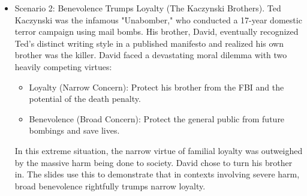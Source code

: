 \documentclass[12pt]{article}
\begin{document}
\begin{enumerate}
\begin{itemize}
        \item Scenario 2: Benevolence Trumps Loyalty (The Kaczynski Brothers). Ted Kaczynski was the infamous "Unabomber," who conducted a 17-year domestic terror campaign using mail bombs. His brother, David, eventually recognized Ted's distinct writing style in a published manifesto and realized his own brother was the killer.\newline
        David faced a devastating moral dilemma with two heavily competing virtues:
        \begin{itemize}
            \item Loyalty (Narrow Concern): Protect his brother from the FBI and the potential of the death penalty.
            \item Benevolence (Broad Concern): Protect the general public from future bombings and save lives.
        \end{itemize}
        In this extreme situation, the narrow virtue of familial loyalty was outweighed by the massive harm being done to society. David chose to turn his brother in. The slides use this to demonstrate that in contexts involving severe harm, broad benevolence rightfully trumps narrow loyalty.
    \end{itemize}
\end{enumerate}
\end{document}
